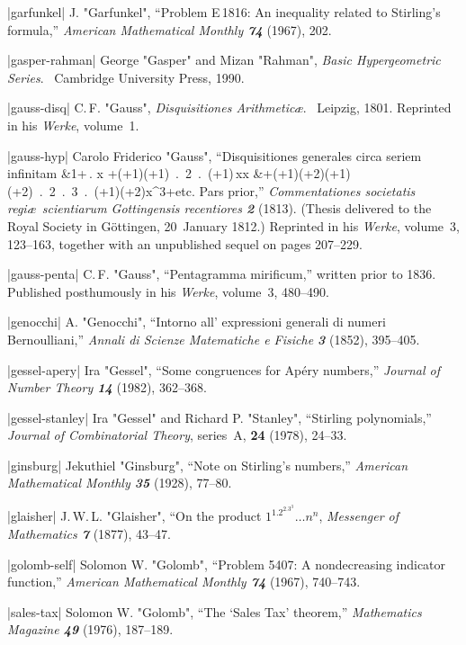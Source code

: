 \bib|garfunkel|%
J. "Garfunkel", ``Problem E\,1816: An inequality related to Stirling's
formula,'' {\sl American Mathematical Monthly\/ \bf74} (1967), 202.

\bib|gasper-rahman|%
George "Gasper" and Mizan "Rahman", {\sl Basic Hypergeometric Series}. \
Cambridge University Press, 1990.

\bib|gauss-disq|%
C.\,F. "Gauss", {\sl Disquisitiones Arithmetic\ae}. \
Leipzig, 1801. Reprinted in his {\sl Werke}, volume~1.

\bib|gauss-hyp|%
Carolo Friderico "Gauss", ``Disquisitiones generales circa seriem
infinitam
\begindisplay \openup2pt
&1+{\alpha\beta{}\,.\,\gamma}\,x
 +{\alpha(\alpha+1)\beta(\beta+1)\ .\ 2\ .\ \gamma(\gamma+1)}\,xx\cr
&\qquad +{\alpha(\alpha+1)(\alpha+2)\beta(\beta+1)(\beta+2)\over
    1\ .\ 2\ .\ 3\ .\ \gamma(\gamma+1)(\gamma+2)}x^3+\rm etc.
\enddisplay
Pars prior,'' {\sl Commentationes societatis regi\ae\ scientiarum Gottingensis
recentiores\/ \bf2} (1813). (Thesis delivered to the Royal Society in
G\"ottingen, 20~January 1812.)
 Reprinted in his {\sl Werke}, volume~3, 123--163,
together with an unpublished sequel on pages 207--229.

\bib|gauss-penta|%
C.\,F. "Gauss", ``Pentagramma mirificum,'' written prior to 1836.
Published posthumously in his {\sl Werke}, volume~3, 480--490.

\bib|genocchi|%
A. "Genocchi", ``Intorno all' expressioni generali di numeri Bernoulliani,''
{\sl Annali di Scienze Matematiche e Fisiche\/ \bf3} (1852), 395--405.

\bib|gessel-apery|%
Ira "Gessel", ``Some congruences for Ap\'ery numbers,''
{\sl Journal of Number Theory\/ \bf14} (1982), 362--368.

\bib|gessel-stanley|%
Ira "Gessel" and Richard P. "Stanley", ``Stirling polynomials,''
{\sl Journal of Combinatorial Theory}, series~A, {\bf24} (1978), 24--33.

\bib|ginsburg|%
Jekuthiel "Ginsburg", ``Note on Stirling's numbers,''
{\sl American Mathematical Monthly\/ \bf35} (1928), 77--80.

\bib|glaisher|%
J.\,W.\,L. "Glaisher", ``On the product
$1^1.2^2.3^3\ldots n^n$, {\sl Messenger of Mathematics\/ \bf7} (1877),
43--47.

\bib|golomb-self|%
Solomon W. "Golomb", ``Problem 5407: A nondecreasing indicator function,''
{\sl American Mathematical Monthly\/ \bf74} (1967), 740--743.

\bib|sales-tax|%
Solomon W. "Golomb", ``The `Sales Tax' theorem,'' {\sl Mathematics
Magazine\/ \bf49} (1976), 187--189.

